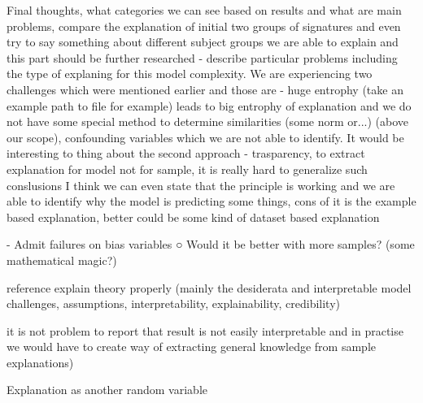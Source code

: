 Final thoughts, what categories we can see based on results and what are main problems, compare the explanation of initial two groups of signatures and even try to say something about different subject groups
we are able to explain and this part should be further researched - describe particular problems including the type of explaning for this model complexity.
We are experiencing two challenges which were mentioned earlier and those are - huge entrophy (take an example path to file for example) leads to big entrophy of explanation and we do not have some special method to determine similarities (some norm or...) (above our scope), confounding variables which we are not able to identify.
It would be interesting to thing about the second approach - trasparency, to extract explanation for model not for sample, it is really hard to generalize such conslusions
I think we can even state that the principle is working and we are able to identify why the model is predicting some things, cons of it is the example based explanation, better could be some kind of dataset based explanation

- Admit failures on bias variables
  ○ Would it be better with more samples? (some mathematical magic?)

  reference explain theory properly (mainly the desiderata and interpretable model challenges, assumptions, interpretability, explainability, credibility)

it is not problem to report that result is not easily interpretable and in practise we would have to create way of extracting general knowledge from sample explanations)

Explanation as another random variable

  

